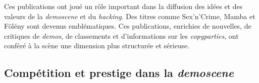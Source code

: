 Ces publications ont joué un rôle important dans la diffusion des idées et des valeurs de la \textit{demoscene} et du \textit{hacking}. Des titres comme Sex'n'Crime, Mamba et Fölény sont devenus emblématiques. Ces publications, enrichies de nouvelles, de critiques de \textit{demos}, de classements et d'informations sur les \textit{copyparties}, ont conféré à la scène une dimension plus structurée et sérieuse. 




\subsection*{Compétition et prestige dans la \textit{demoscene}}

